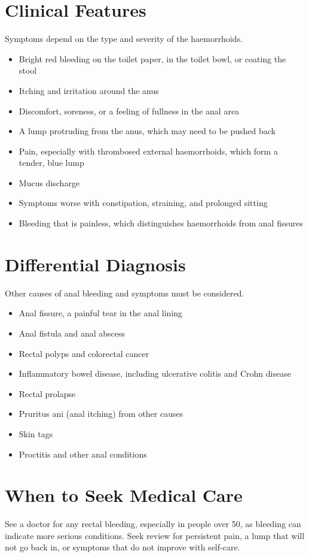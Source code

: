 \section*{Clinical Features}
Symptoms depend on the type and severity of the haemorrhoids.

\begin{itemize}
    \item Bright red bleeding on the toilet paper, in the toilet bowl, or coating the stool
    \item Itching and irritation around the anus
    \item Discomfort, soreness, or a feeling of fullness in the anal area
    \item A lump protruding from the anus, which may need to be pushed back
    \item Pain, especially with thrombosed external haemorrhoids, which form a tender, blue lump
    \item Mucus discharge
    \item Symptoms worse with constipation, straining, and prolonged sitting
    \item Bleeding that is painless, which distinguishes haemorrhoids from anal fissures
\end{itemize}

\section*{Differential Diagnosis}
Other causes of anal bleeding and symptoms must be considered.

\begin{itemize}
    \item Anal fissure, a painful tear in the anal lining
    \item Anal fistula and anal abscess
    \item Rectal polyps and colorectal cancer
    \item Inflammatory bowel disease, including ulcerative colitis and Crohn disease
    \item Rectal prolapse
    \item Pruritus ani (anal itching) from other causes
    \item Skin tags
    \item Proctitis and other anal conditions
\end{itemize}

\section*{When to Seek Medical Care}
See a doctor for any rectal bleeding, especially in people over 50, as bleeding can indicate more serious conditions. Seek review for persistent pain, a lump that will not go back in, or symptoms that do not improve with self-care.

